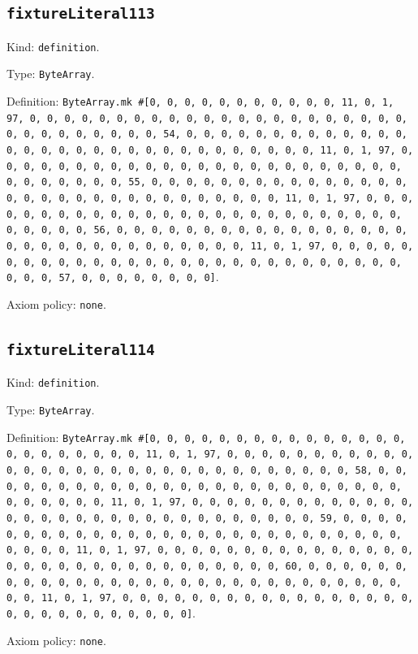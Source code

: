 \documentclass[11pt]{article}
\begin{document}
\subsection*{\texttt{fixtureLiteral113}}
\noindent Kind: \texttt{definition}.\par
\noindent Type: \texttt{ByteArray}.\par
\noindent Definition: \texttt{ByteArray.mk \#[0, 0, 0, 0, 0, 0, 0, 0, 0, 0, 0, 11, 0, 1, 97, 0, 0, 0, 0, 0, 0, 0, 0, 0, 0, 0, 0, 0, 0, 0, 0, 0, 0, 0, 0, 0, 0, 0, 0, 0, 0, 0, 0, 0, 0, 0, 54, 0, 0, 0, 0, 0, 0, 0, 0, 0, 0, 0, 0, 0, 0, 0, 0, 0, 0, 0, 0, 0, 0, 0, 0, 0, 0, 0, 0, 0, 0, 0, 11, 0, 1, 97, 0, 0, 0, 0, 0, 0, 0, 0, 0, 0, 0, 0, 0, 0, 0, 0, 0, 0, 0, 0, 0, 0, 0, 0, 0, 0, 0, 0, 0, 0, 0, 55, 0, 0, 0, 0, 0, 0, 0, 0, 0, 0, 0, 0, 0, 0, 0, 0, 0, 0, 0, 0, 0, 0, 0, 0, 0, 0, 0, 0, 0, 0, 0, 11, 0, 1, 97, 0, 0, 0, 0, 0, 0, 0, 0, 0, 0, 0, 0, 0, 0, 0, 0, 0, 0, 0, 0, 0, 0, 0, 0, 0, 0, 0, 0, 0, 0, 0, 56, 0, 0, 0, 0, 0, 0, 0, 0, 0, 0, 0, 0, 0, 0, 0, 0, 0, 0, 0, 0, 0, 0, 0, 0, 0, 0, 0, 0, 0, 0, 0, 11, 0, 1, 97, 0, 0, 0, 0, 0, 0, 0, 0, 0, 0, 0, 0, 0, 0, 0, 0, 0, 0, 0, 0, 0, 0, 0, 0, 0, 0, 0, 0, 0, 0, 0, 57, 0, 0, 0, 0, 0, 0, 0, 0]}.\par
\noindent Axiom policy: \texttt{none}.\par
\subsection*{\texttt{fixtureLiteral114}}
\noindent Kind: \texttt{definition}.\par
\noindent Type: \texttt{ByteArray}.\par
\noindent Definition: \texttt{ByteArray.mk \#[0, 0, 0, 0, 0, 0, 0, 0, 0, 0, 0, 0, 0, 0, 0, 0, 0, 0, 0, 0, 0, 0, 0, 11, 0, 1, 97, 0, 0, 0, 0, 0, 0, 0, 0, 0, 0, 0, 0, 0, 0, 0, 0, 0, 0, 0, 0, 0, 0, 0, 0, 0, 0, 0, 0, 0, 0, 0, 58, 0, 0, 0, 0, 0, 0, 0, 0, 0, 0, 0, 0, 0, 0, 0, 0, 0, 0, 0, 0, 0, 0, 0, 0, 0, 0, 0, 0, 0, 0, 0, 11, 0, 1, 97, 0, 0, 0, 0, 0, 0, 0, 0, 0, 0, 0, 0, 0, 0, 0, 0, 0, 0, 0, 0, 0, 0, 0, 0, 0, 0, 0, 0, 0, 0, 0, 59, 0, 0, 0, 0, 0, 0, 0, 0, 0, 0, 0, 0, 0, 0, 0, 0, 0, 0, 0, 0, 0, 0, 0, 0, 0, 0, 0, 0, 0, 0, 0, 11, 0, 1, 97, 0, 0, 0, 0, 0, 0, 0, 0, 0, 0, 0, 0, 0, 0, 0, 0, 0, 0, 0, 0, 0, 0, 0, 0, 0, 0, 0, 0, 0, 0, 0, 60, 0, 0, 0, 0, 0, 0, 0, 0, 0, 0, 0, 0, 0, 0, 0, 0, 0, 0, 0, 0, 0, 0, 0, 0, 0, 0, 0, 0, 0, 0, 0, 11, 0, 1, 97, 0, 0, 0, 0, 0, 0, 0, 0, 0, 0, 0, 0, 0, 0, 0, 0, 0, 0, 0, 0, 0, 0, 0, 0, 0, 0, 0, 0]}.\par
\noindent Axiom policy: \texttt{none}.\par
\end{document}
